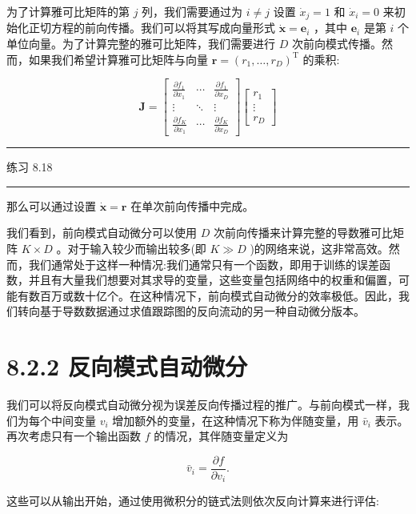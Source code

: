 \documentclass[10pt]{article}
\newcommand{\HRule}{\begin{center}\rule{0.9\linewidth}{0.2mm}\end{center}}
\begin{document}
为了计算雅可比矩阵的第 \(j\) 列，我们需要通过为 \(i \neq  j\) 设置 \({\dot{x}}_{j} = 1\) 和 \({\dot{x}}_{i} = 0\) 来初始化正切方程的前向传播。我们可以将其写成向量形式 \(\dot{\mathbf{x}} = {\mathbf{e}}_{i}\) ，其中 \({\mathbf{e}}_{i}\) 是第 \(i\) 个单位向量。为了计算完整的雅可比矩阵，我们需要进行 \(D\) 次前向模式传播。然而，如果我们希望计算雅可比矩阵与向量 \(\mathbf{r} = {\left( {r}_{1},\ldots ,{r}_{D}\right) }^{\mathrm{T}}\) 的乘积:

\[
\mathbf{J} = \left\lbrack  \begin{matrix} \frac{\partial {f}_{1}}{\partial {x}_{1}} & \cdots & \frac{\partial {f}_{1}}{\partial {x}_{D}} \\  \vdots &  \ddots  & \vdots \\  \frac{\partial {f}_{K}}{\partial {x}_{1}} & \cdots & \frac{\partial {f}_{K}}{\partial {x}_{D}} \end{matrix}\right\rbrack  \left\lbrack  \begin{matrix} {r}_{1} \\  \vdots \\  {r}_{D} \end{matrix}\right\rbrack   \tag{8.67}
\]

\HRule

练习 8.18

\HRule

那么可以通过设置 \(\dot{\mathbf{x}} = \mathbf{r}\) 在单次前向传播中完成。

我们看到，前向模式自动微分可以使用 \(D\) 次前向传播来计算完整的导数雅可比矩阵 \(K \times  D\) 。对于输入较少而输出较多(即 \(K \gg  D\) )的网络来说，这非常高效。然而，我们通常处于这样一种情况:我们通常只有一个函数，即用于训练的误差函数，并且有大量我们想要对其求导的变量，这些变量包括网络中的权重和偏置，可能有数百万或数十亿个。在这种情况下，前向模式自动微分的效率极低。因此，我们转向基于导数数据通过求值跟踪图的反向流动的另一种自动微分版本。

\section*{8.2.2 反向模式自动微分}

我们可以将反向模式自动微分视为误差反向传播过程的推广。与前向模式一样，我们为每个中间变量 \({v}_{i}\) 增加额外的变量，在这种情况下称为伴随变量，用 \({\bar{v}}_{i}\) 表示。再次考虑只有一个输出函数 \(f\) 的情况，其伴随变量定义为

\[
{\bar{v}}_{i} = \frac{\partial f}{\partial {v}_{i}}. \tag{8.68}
\]

这些可以从输出开始，通过使用微积分的链式法则依次反向计算来进行评估:
\end{document}
